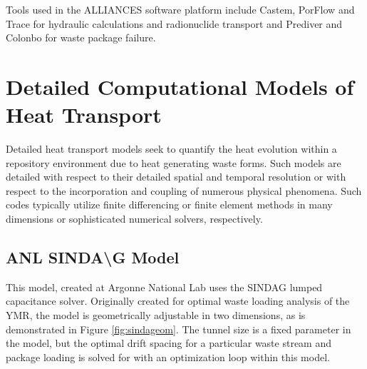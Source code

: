 {Tools used in the ALLIANCES software platform include Castem, PorFlow and Trace
for hydraulic calculations and radionuclide transport and Prediver and Colonbo for
waste package failure.






\section{Detailed Computational Models of Heat Transport}
\label{sec:detailed_heat}


Detailed heat transport models seek to quantify the heat evolution within a 
repository environment due to heat generating waste forms. Such models are 
detailed with respect to their detailed spatial and temporal resolution or 
with respect to the incorporation and coupling of numerous physical phenomena. 
Such codes typically utilize finite differencing or finite element methods in 
many dimensions or sophisticated numerical solvers, respectively. 



\subsection{ANL SINDA{\textbackslash}G Model}

This model, created at Argonne National Lab  uses the \gls{SINDAG} 
lumped capacitance solver. Originally created for optimal waste loading analysis 
of the \gls{YMR}, the model is geometrically adjustable in two dimensions,   
as is demonstrated in Figure \ref{fig:sindageom}. The tunnel size is a fixed 
parameter in the model, but the optimal drift spacing for a particular waste 
stream and package loading is solved for with an optimization loop within this 
model.

}
